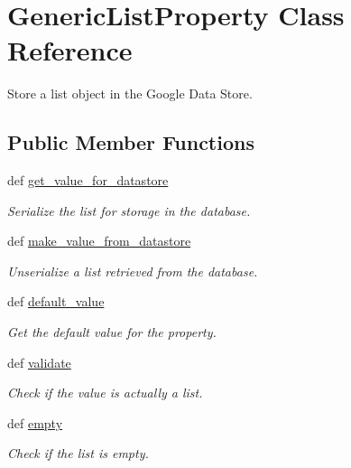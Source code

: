 \hypertarget{classbackend_1_1_generic_list_property}{
\section{GenericListProperty Class Reference}
\label{classbackend_1_1_generic_list_property}
}


Store a list object in the Google Data Store.  


\subsection*{Public Member Functions}
\begin{DoxyCompactItemize}
\item 
def \hyperlink{classbackend_1_1_generic_list_property_a54cc138e6df3ad55c38fa5db72327963}{get\_\-value\_\-for\_\-datastore}
\begin{DoxyCompactList}\small\item\em Serialize the list for storage in the database. \item\end{DoxyCompactList}\item 
def \hyperlink{classbackend_1_1_generic_list_property_a464c5a5f52df989128b5fc067ea34512}{make\_\-value\_\-from\_\-datastore}
\begin{DoxyCompactList}\small\item\em Unserialize a list retrieved from the database. \item\end{DoxyCompactList}\item 
def \hyperlink{classbackend_1_1_generic_list_property_a64bfffc058d933b3b0599f5bc7c049d1}{default\_\-value}
\begin{DoxyCompactList}\small\item\em Get the default value for the property. \item\end{DoxyCompactList}\item 
def \hyperlink{classbackend_1_1_generic_list_property_a8f3dc5c8aaf85c281c2f52cda259aa56}{validate}
\begin{DoxyCompactList}\small\item\em Check if the value is actually a list. \item\end{DoxyCompactList}\item 
def \hyperlink{classbackend_1_1_generic_list_property_aad7084fad37d1cf9b41a738ecfbbd249}{empty}
\begin{DoxyCompactList}\small\item\em Check if the list is empty. \item\end{DoxyCompactList}\end{DoxyCompactItemize}

